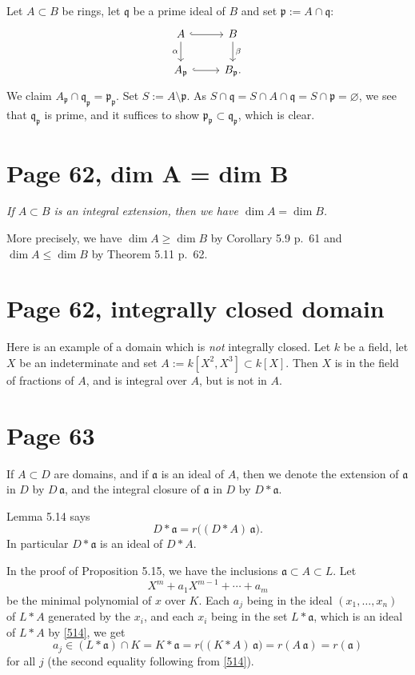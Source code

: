 \documentclass[12pt]{article}
\newcommand{\mf}{\mathfrak}
\begin{document}
Let $A\subset B$ be rings, let $\mf q$ be a prime ideal of $B$ and set $\mf p:=A\cap\mf q$:
$$
\begin{tikzcd}
A\ar[d,"\alpha"']\ar[r,hook]&B\ar[d,"\beta"]\\ 
A_{\mf p}\ar[r,hook]&B_{\mf p}.
\end{tikzcd}
$$
We claim $A_{\mf p}\cap\mf q_{\mf p}=\mf p_{\mf p}$. Set $S:=A\setminus\mf p$. As $S\cap\mf q=S\cap A\cap\mf q=S\cap\mf p=\varnothing$, we see that $\mf q_{\mf p}$ is prime, and it suffices to show $\mf p_{\mf p}\subset\mf q_{\mf p}$, which is clear.

\section{Page 62, dim A = dim B}%

\emph{If $A\subset B$ is an integral extension, then we have $\dim A=\dim B$.}

More precisely, we have $\dim A\ge\dim B$ by Corollary 5.9 p.~61 and $\dim A\le\dim B$ by Theorem 5.11 p.~62.

\section{Page 62, integrally closed domain}%

Here is an example of a domain which is \emph{not} integrally closed. Let $k$ be a field, let $X$ be an indeterminate and set $A:=k[X^2,X^3]\subset k[X]$. Then $X$ is in the field of fractions of $A$, and is integral over $A$, but is not in $A$.

\section{Page 63}%

If $A\subset D$ are domains, and if $\mf a$ is an ideal of $A$, then we denote the extension of $\mf a$ in $D$ by $D\,\mf a$, and the integral closure of $\mf a$ in $D$ by $D*\mf a$. 

Lemma 5.14 says
\begin{equation}\label{514}
D*\mf a=r\Big((D*A)\,\mf a\Big).
\end{equation}
In particular $D*\mf a$ is an ideal of $D*A$. 

In the proof of Proposition 5.15, we have the inclusions $\mf a\subset A\subset L$. Let 
$$
X^m+a_1X^{m-1}+\cdots+a_m
$$ 
be the minimal polynomial of $x$ over $K$. Each $a_j$ being in the ideal $(x_1,\dots,x_n)$ of $L*A$ generated by the $x_i$, and each $x_i$ being in the set $L*\mf a$, which is an ideal of $L*A$ by \eqref{514}, we get 
$$
a_j\in(L*\mf a)\cap K=K*\mf a=r\Big((K*A)\,\mf a\Big)=r(A\,\mf a)=r(\mf a)
$$ 
for all $j$ (the second equality following from \eqref{514}).
\end{document}
